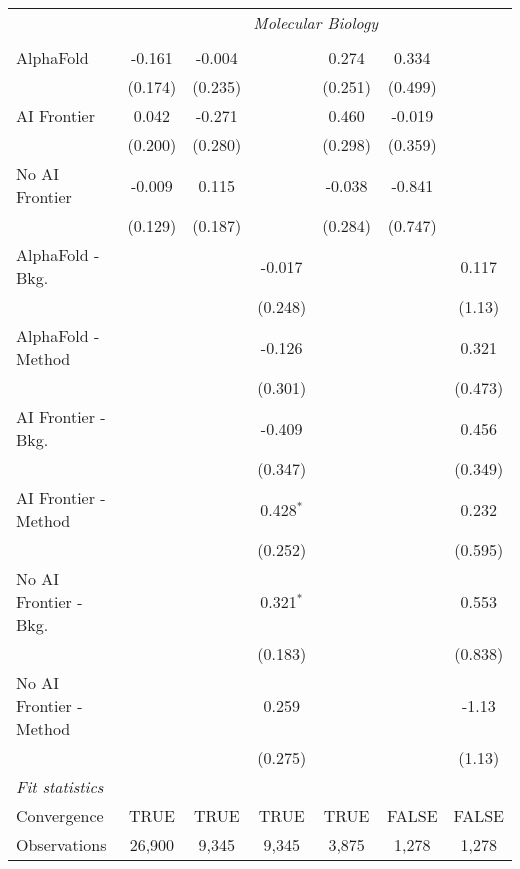 \begin{tabular}{lcccccc}
 & \multicolumn{6}{c}{\textit{Molecular Biology}} \\ \\
   AlphaFold               & -0.161  & -0.004  &             & 0.274   & 0.334   &   \\   
                           & (0.174) & (0.235) &             & (0.251) & (0.499) &   \\   
   AI Frontier             & 0.042   & -0.271  &             & 0.460   & -0.019  &   \\   
                           & (0.200) & (0.280) &             & (0.298) & (0.359) &   \\   
   No AI Frontier          & -0.009  & 0.115   &             & -0.038  & -0.841  &   \\   
                           & (0.129) & (0.187) &             & (0.284) & (0.747) &   \\   
   AlphaFold - Bkg.        &         &         & -0.017      &         &         & 0.117\\   
                           &         &         & (0.248)     &         &         & (1.13)\\   
   AlphaFold - Method      &         &         & -0.126      &         &         & 0.321\\   
                           &         &         & (0.301)     &         &         & (0.473)\\   
   AI Frontier - Bkg.      &         &         & -0.409      &         &         & 0.456\\   
                           &         &         & (0.347)     &         &         & (0.349)\\   
   AI Frontier - Method    &         &         & 0.428$^{*}$ &         &         & 0.232\\   
                           &         &         & (0.252)     &         &         & (0.595)\\   
   No AI Frontier - Bkg.   &         &         & 0.321$^{*}$ &         &         & 0.553\\   
                           &         &         & (0.183)     &         &         & (0.838)\\   
   No AI Frontier - Method &         &         & 0.259       &         &         & -1.13\\   
                           &         &         & (0.275)     &         &         & (1.13)\\   
   \midrule
   \emph{Fit statistics}\\
   Convergence             &TRUE     & TRUE    & TRUE        & TRUE    & FALSE   & FALSE\\  
   Observations            & 26,900  & 9,345   & 9,345       & 3,875   & 1,278   & 1,278\\  
   

\end{tabular}
